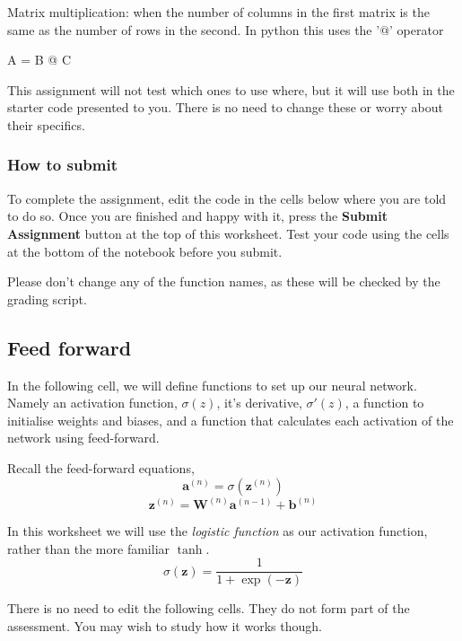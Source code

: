 \documentclass[11pt]{article}
\newenvironment{Shaded}{}{}
\newcommand{\NormalTok}[1]{{#1}}
\newcommand{\OperatorTok}[1]{\textcolor[rgb]{0.40,0.40,0.40}{{#1}}}
\begin{document}
Matrix multiplication: when the number of columns in the first matrix is
the same as the number of rows in the second. In python this uses the
'\(@\)' operator

\begin{Shaded}
\begin{Highlighting}[]
\NormalTok{A }\OperatorTok{=}\NormalTok{ B }\OperatorTok{@}\NormalTok{ C}
\end{Highlighting}
\end{Shaded}

This assignment will not test which ones to use where, but it will use
both in the starter code presented to you. There is no need to change
these or worry about their specifics.

\subsubsection{How to submit}\label{how-to-submit}

To complete the assignment, edit the code in the cells below where you
are told to do so. Once you are finished and happy with it, press the
\textbf{Submit Assignment} button at the top of this worksheet. Test
your code using the cells at the bottom of the notebook before you
submit.

Please don't change any of the function names, as these will be checked
by the grading script.

    \subsection{Feed forward}\label{feed-forward}

In the following cell, we will define functions to set up our neural
network. Namely an activation function, \(\sigma(z)\), it's derivative,
\(\sigma'(z)\), a function to initialise weights and biases, and a
function that calculates each activation of the network using
feed-forward.

Recall the feed-forward equations,
\[ \mathbf{a}^{(n)} = \sigma(\mathbf{z}^{(n)}) \]
\[ \mathbf{z}^{(n)} = \mathbf{W}^{(n)}\mathbf{a}^{(n-1)} + \mathbf{b}^{(n)} \]

In this worksheet we will use the \emph{logistic function} as our
activation function, rather than the more familiar \(\tanh\).
\[ \sigma(\mathbf{z}) = \frac{1}{1 + \exp(-\mathbf{z})} \]

There is no need to edit the following cells. They do not form part of
the assessment. You may wish to study how it works though.
\end{document}
